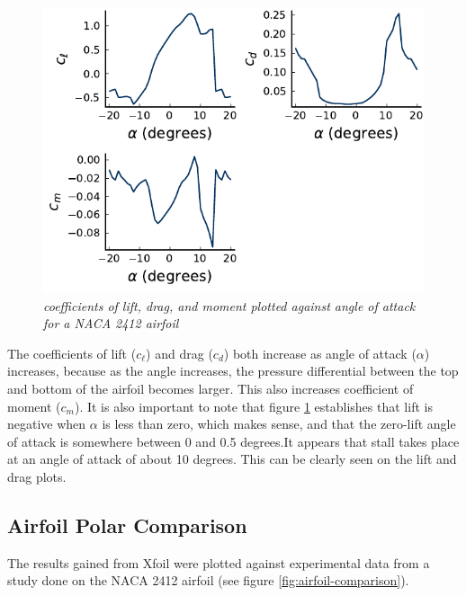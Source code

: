 \documentclass{journal}
\begin{document}
	\begin{figure}
		\centering
		\includegraphics{../graphics/aoa-coefficients.pdf}
		\caption{\emph{coefficients of lift, drag, and moment plotted against angle of attack for a NACA 2412 airfoil}}
		\label{fig:aoa-coefficients}
	\end{figure}
	
	The coefficients of lift (\(c_\ell\)) and drag (\(c_d\)) both increase as angle of attack (\(\alpha\)) increases, because as the angle increases, the pressure differential between the top and bottom of the airfoil becomes larger. This also increases coefficient of moment (\(c_m\)). It is also important to note that figure \ref{fig:aoa-coefficients} establishes that lift is negative when \(\alpha\) is less than zero, which makes sense, and that the zero-lift angle of attack is somewhere between 0 and 0.5 degrees.It appears that stall takes place at an angle of attack of about 10 degrees. This can be clearly seen on the lift and drag plots.
	
	\subsection{Airfoil Polar Comparison}
	The results gained from Xfoil were plotted against experimental data from a study done on the NACA 2412 airfoil (see figure \ref{fig:airfoil-comparison}).
	
\end{document}
